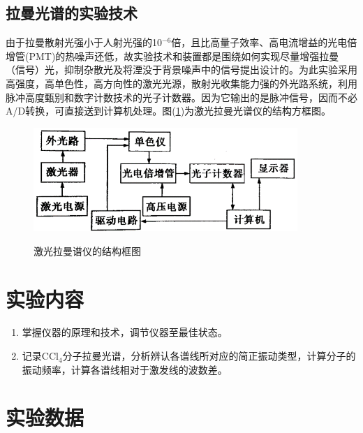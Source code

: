 \documentclass[a4paper]{article}
\begin{document}
\subsection{拉曼光谱的实验技术}
由于拉曼散射光强小于人射光强的10$^{-6}$倍，且比高量子效率、高电流增益的光电倍增管(PMT)的热噪声还低，故实验技术和装置都是围绕如何实现尽量增强拉曼（信号）光，抑制杂散光及将湮没于背景噪声中的信号提出设计的。为此实验采用高强度，高单色性，高方向性的激光光源，散射光收集能力强的外光路系统，利用脉冲高度甄别和数字计数技术的光子计数器。因为它输出的是脉冲信号，因而不必A/D转换，可直接送到计算机处理。图(\ref{fig5})为激光拉曼光谱仪的结构方框图。
\begin{figure}[!h]
\centering
\includegraphics[width=10cm]{fig/5.png}\\
\caption{激光拉曼谱仪的结构框图}\label{fig5}
\end{figure}

\section{实验内容}
\begin{enumerate}
\item 掌握仪器的原理和技术，调节仪器至最佳状态。
\item 记录CCl$_4$分子拉曼光谱，分析辨认各谱线所对应的简正振动类型，计算分子的振动频率，计算各谱线相对于激发线的波数差。
\end{enumerate}

\section{实验数据}
\end{document}
